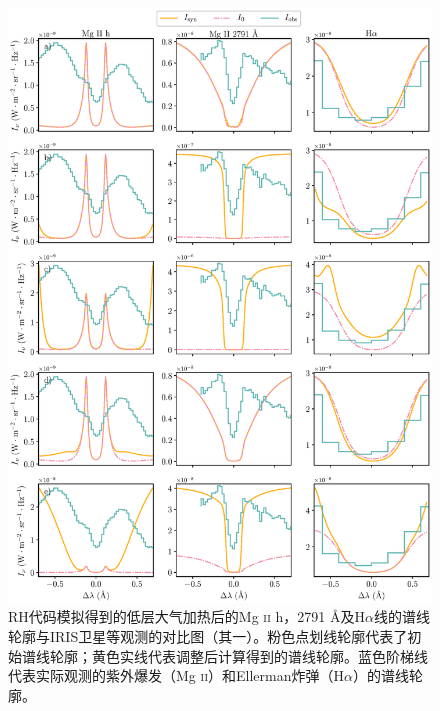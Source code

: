 \begin{figure}
	\centering
	\includegraphics[width=\textwidth]{figs/UVB_spec_1}
	\caption{RH代码模拟得到的低层大气加热后的Mg \textsc{ii} h，2791 \mbox{\AA}及H$\alpha$线的谱线轮廓与IRIS卫星等观测的对比图（其一）。粉色点划线轮廓代表了初始谱线轮廓；黄色实线代表调整后计算得到的谱线轮廓。蓝色阶梯线代表实际观测的紫外爆发（Mg \textsc{ii}）和Ellerman炸弹（H$\alpha$）的谱线轮廓。}
	\label{fig:5.2}
\end{figure}

